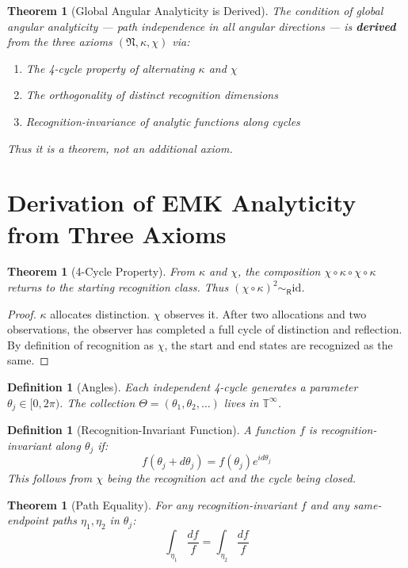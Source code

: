 \documentclass[12pt]{article}
\newtheorem{definition}[axiom]{Definition}
\newtheorem{theorem}[axiom]{Theorem}
\newcommand{\rec}{\mathsf{R}}
\begin{document}
\begin{theorem}[Global Angular Analyticity is Derived]
The condition of global angular analyticity — path independence in all angular directions — is \textbf{derived} from the three axioms \((\mathfrak N, \kappa, \chi)\) via:
\begin{enumerate}
    \item The 4-cycle property of alternating \(\kappa\) and \(\chi\)
    \item The orthogonality of distinct recognition dimensions
    \item Recognition-invariance of analytic functions along cycles
\end{enumerate}
Thus it is a theorem, not an additional axiom.
\end{theorem}
\section{Derivation of EMK Analyticity from Three Axioms}

\begin{theorem}[4-Cycle Property]
From \(\kappa\) and \(\chi\), the composition \(\chi \circ \kappa \circ \chi \circ \kappa\) returns to the starting recognition class.
Thus \((\chi \circ \kappa)^2 \sim_{\rec} \text{id}\).
\end{theorem}

\begin{proof}
\(\kappa\) allocates distinction. \(\chi\) observes it. After two allocations and two observations, the observer has completed a full cycle of distinction and reflection. By definition of recognition as \(\chi\), the start and end states are recognized as the same.
\end{proof}

\begin{definition}[Angles]
Each independent 4-cycle generates a parameter \(\theta_j \in [0, 2\pi)\). The collection \(\Theta = (\theta_1, \theta_2, \ldots)\) lives in \(\mathbb{T}^\infty\).
\end{definition}

\begin{definition}[Recognition-Invariant Function]
A function \(f\) is recognition-invariant along \(\theta_j\) if:
\[
f(\theta_j + d\theta_j) = f(\theta_j) e^{i d\theta_j}
\]
This follows from \(\chi\) being the recognition act and the cycle being closed.
\end{definition}

\begin{theorem}[Path Equality]
For any recognition-invariant \(f\) and any same-endpoint paths \(\eta_1, \eta_2\) in \(\theta_j\):
\[
\int_{\eta_1} \frac{df}{f} = \int_{\eta_2} \frac{df}{f}
\]
\end{theorem}
\end{document}
